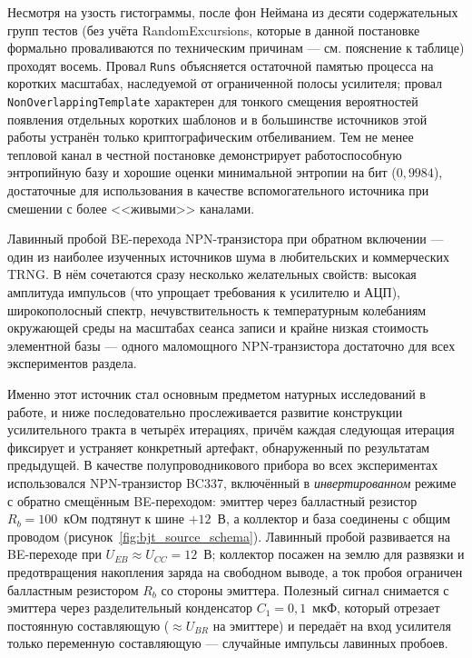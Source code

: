 Несмотря на узость гистограммы, после фон Неймана из десяти содержательных групп
тестов (без учёта RandomExcursions, которые в данной постановке формально проваливаются
по техническим причинам --- см. пояснение к таблице) проходят восемь. Провал
\texttt{Runs} объясняется остаточной памятью процесса на коротких масштабах,
наследуемой от ограниченной полосы усилителя; провал \texttt{NonOverlapping\-Template}
характерен для тонкого смещения вероятностей появления отдельных коротких шаблонов
и в большинстве источников этой работы устранён только криптографическим
отбеливанием. Тем не менее тепловой канал в честной постановке демонстрирует
работоспособную энтропийную базу и хорошие оценки минимальной энтропии на бит
($0{,}9984$), достаточные для использования в качестве вспомогательного источника
при смешении с более <<живыми>> каналами.


Лавинный пробой BE-перехода NPN-транзистора при обратном включении --- один из
наиболее изученных источников шума в любительских и коммерческих TRNG. В нём сочетаются
сразу несколько желательных свойств: высокая амплитуда импульсов (что упрощает
требования к усилителю и АЦП), широкополосный спектр, нечувствительность к
температурным колебаниям окружающей среды на масштабах сеанса записи и крайне низкая
стоимость элементной базы --- одного маломощного NPN-транзистора достаточно для всех
экспериментов раздела.

Именно этот источник стал основным предметом натурных исследований в работе, и ниже
последовательно прослеживается развитие конструкции усилительного тракта в четырёх
итерациях, причём каждая следующая итерация фиксирует и устраняет конкретный
артефакт, обнаруженный по результатам предыдущей. В качестве полупроводникового
прибора во всех экспериментах использовался NPN-транзистор BC337, включённый в
\emph{инвертированном} режиме с обратно смещённым BE-переходом: эмиттер через
балластный резистор $R_b=100$~кОм подтянут к шине $+12$~В, а коллектор и база
соединены с общим проводом (рисунок~\ref{fig:bjt_source_schema}). Лавинный
пробой развивается на BE-переходе при $U_{EB}\approx U_{CC}=12$~В; коллектор
посажен на землю для развязки и предотвращения накопления заряда на свободном
выводе, а ток пробоя ограничен балластным резистором $R_b$ со стороны эмиттера.
Полезный сигнал снимается с эмиттера через разделительный конденсатор
$C_1=0{,}1$~мкФ, который отрезает постоянную составляющую (${\approx}U_{BR}$ на
эмиттере) и передаёт на вход усилителя только переменную составляющую ---
случайные импульсы лавинных пробоев.


